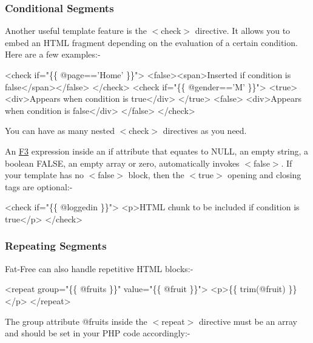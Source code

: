 \subsubsection*{Conditional Segments}

Another useful template feature is the {\ttfamily $<$check$>$} directive. It allows you to embed an H\+T\+ML fragment depending on the evaluation of a certain condition. Here are a few examples\+:-\/


\begin{DoxyCode}
<check if="\{\{ @page=='Home' \}\}">
    <false><span>Inserted if condition is false</span></false>
</check>
<check if="\{\{ @gender=='M' \}\}">
    <true>
        <div>Appears when condition is true</div>
    </true>
    <false>
        <div>Appears when condition is false</div>
    </false>
</check>
\end{DoxyCode}


You can have as many nested {\ttfamily $<$check$>$} directives as you need.

An \hyperlink{class_f3}{F3} expression inside an if attribute that equates to {\ttfamily N\+U\+LL}, an empty string, a boolean {\ttfamily F\+A\+L\+SE}, an empty array or zero, automatically invokes {\ttfamily $<$false$>$}. If your template has no {\ttfamily $<$false$>$} block, then the {\ttfamily $<$true$>$} opening and closing tags are optional\+:-\/


\begin{DoxyCode}
<check if="\{\{ @loggedin \}\}">
    <p>HTML chunk to be included if condition is true</p>
</check>
\end{DoxyCode}


\subsubsection*{Repeating Segments}

Fat-\/\+Free can also handle repetitive H\+T\+ML blocks\+:-\/


\begin{DoxyCode}
<repeat group="\{\{ @fruits \}\}" value="\{\{ @fruit \}\}">
    <p>\{\{ trim(@fruit) \}\}</p>
</repeat>
\end{DoxyCode}


The {\ttfamily group} attribute {\ttfamily @fruits} inside the {\ttfamily $<$repeat$>$} directive must be an array and should be set in your P\+HP code accordingly\+:-\/




